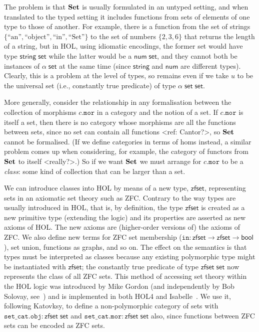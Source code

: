 \documentclass[twoside,titlepage,11pt]{article}
\begin{document}
The problem is that $\mathbf{Set}$ is usually formulated in an untyped setting, and when translated to the typed setting it includes functions from sets of elements of one type to those of another.
For example, there is a function from the set of strings $\{\text{``an''},\text{``object''},\text{``in''},\text{``Set''}\}$ to the set of numbers $\{2,3,6\}$ that returns the length of a string, but in HOL, using idiomatic encodings, the former set would have type $\mathsf{string}\;\mathsf{set}$ while the latter would be a $\mathsf{num}\;\mathsf{set}$, and they cannot both be instances of $\alpha\;\mathsf{set}$ at the same time (since $\mathsf{string}$ and $\mathsf{num}$ are different types).
Clearly, this is a problem at the level of types, so remains even if we take $u$ to be the universal set (i.e., constantly true predicate) of type $\alpha\;\mathsf{set}\;\mathsf{set}$.

More generally, consider the relationship in any formalisation between the collection of morphisms $c.\mathtt{mor}$ in a category and the notion of a set.
If $c.\mathtt{mor}$ is itself a set, then there is no category whose morphisms are all the functions between sets, since no set can contain all functions <ref: Cantor?>, so $\mathbf{Set}$ cannot be formalised.
(If we define categories in terms of homs instead, a similar problem comes up when considering, for example, the category of functors from $\mathbf{Set}$ to itself <really?>.)
So if we want $\mathbf{Set}$ we must arrange for $c.\mathtt{mor}$ to be a \emph{class}: some kind of collection that can be larger than a set.

We can introduce classes into HOL by means of a new type, $\mathsf{zfset}$, representing sets in an axiomatic set theory such as ZFC.
Contrary to the way types are usually introduced in HOL, that is, by definition, the type $\mathsf{zfset}$ is created as a new primitive type (extending the logic) and its properties are asserted as new axioms of HOL.
The new axioms are (higher-order versions of) the axioms of ZFC.
We also define new terms for ZFC set membership ($\mathtt{in}:\mathsf{zfset}\to\mathsf{zfset}\to\mathsf{bool}$), set union, functions as graphs, and so on.
The effect on the semantics is that types must be interpreted as classes because any existing polymorphic type might be instantiated with $\mathsf{zfset}$; the constantly true predicate of type $\mathsf{zfset}\;\mathsf{set}$ now represents the class of all ZFC sets.
This method of accessing set theory within the HOL logic was introduced by Mike Gordon \cite{DBLP:conf/tphol/Gordon96} (and independently by Bob Solovay, see~\cite{DBLP:conf/ictac/Obua06}) and is implemented in both HOL4 and Isabelle~\cite{DBLP:conf/ictac/Obua06}.
We use it, following Katovksy, to define a non-polymorphic category of sets with $\mathtt{set\_cat}.\mathtt{obj}:\mathsf{zfset}\;\mathsf{set}$ and $\mathtt{set\_cat}.\mathtt{mor}:\mathsf{zfset}\;\mathsf{set}$ also, since functions between ZFC sets can be encoded as ZFC sets.
\end{document}
